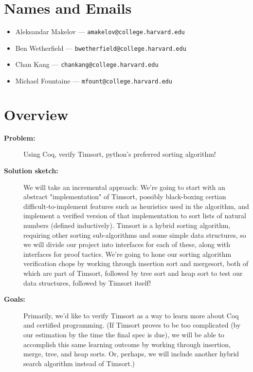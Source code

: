 \documentclass{article}
\begin{document}
\section{Names and Emails}
\begin{itemize}
  \item Aleksandar Makelov --- \texttt{amakelov@college.harvard.edu}
  \item Ben Wetherfield --- \texttt{bwetherfield@college.harvard.edu}
  \item Chan Kang --- \texttt{chankang@college.harvard.edu}
  \item Michael Fountaine --- \texttt{mfount@college.harvard.edu}
\end{itemize}


\section{Overview}
\begin{description}
  \item[\textbf{Problem:}]
    Using Coq, verify Timsort, python's preferred sorting algorithm!
  \item[\textbf{Solution sketch:}]
    We will take an incremental approach:
    We're going to start with an abstract
    "implementation" of Timsort,
    possibly black-boxing certian difficult-to-implement features
    such as heuristics used in the algorithm,
    and implement a verified version of that implementation to sort
    lists of natural numbers (defined inductively).
    Timsort is a hybrid sorting
    algorithm, requiring other sorting sub-algorithms and some simple data
    structures, so we will divide our project into interfaces for each of
    these, along with interfaces for proof tactics.
    We're going to hone our sorting algorithm verification chops
    by working through insertion sort and mergesort, both of which
    are part of Timsort, followed by tree sort and heap sort
    to test our data structures, followed by Timsort itself!
  \item[\textbf{Goals:}]
    Primarily, we'd like to verify Timsort as a way to learn more about
    Coq and certified programming. (If Timsort proves to be too
    complicated (by our estimation by the time the final spec is due),
    we will be able to accomplish this same learning outcome by working
    through insertion, merge, tree, and heap sorts. Or, perhaps, we will
    include another hybrid search algorithm instead of Timsort.)
\end{description}
\end{document}
